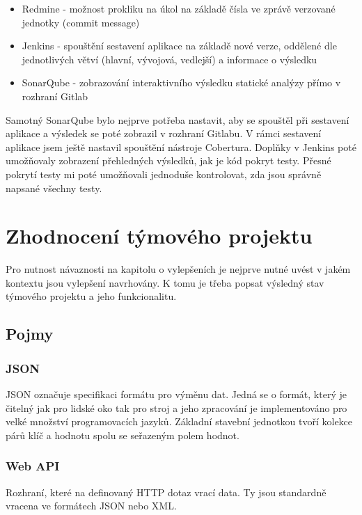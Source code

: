 \documentclass[thesis=B,czech]{FITthesis}[2012/06/26]
\begin{document}
\begin{itemize}
\item Redmine - možnost prokliku na úkol na základě čísla ve zprávě verzované jednotky (commit message)
\item Jenkins - spouštění sestavení aplikace na základě nové verze, oddělené dle jednotlivých větví (hlavní, vývojová, vedlejší) a
				informace o výsledku
\item SonarQube - zobrazování interaktivního výsledku statické analýzy přímo v rozhraní Gitlab
\end{itemize}

Samotný SonarQube bylo nejprve potřeba nastavit, aby se spouštěl při sestavení aplikace a výsledek se poté zobrazil v rozhraní
Gitlabu. V rámci sestavení aplikace jsem ještě nastavil spouštění nástroje Cobertura.
Doplňky v Jenkins poté umožňovaly zobrazení přehledných výsledků, jak je kód pokryt testy. Přesné pokrytí testy mi poté umožňovali 
jednoduše kontrolovat, zda jsou správně napsané všechny testy.

\chapter{Zhodnocení týmového projektu}
Pro nutnost návaznosti na kapitolu o vylepšeních je nejprve nutné uvést v jakém kontextu jsou vylepšení navrhovány. K tomu je třeba
popsat výsledný stav týmového projektu a jeho funkcionalitu. 

\section{Pojmy}

\subsection{JSON}
JSON označuje specifikaci formátu pro výměnu dat\cite{JSON}. Jedná se o formát, který je čitelný jak pro lidské oko tak pro stroj\cite{JSON} a jeho zpracování je implementováno pro velké množství programovacích jazyků\cite{JSON-impl}. Základní stavební jednotkou
tvoří kolekce párů klíč a hodnotu spolu se seřazeným polem hodnot.

\subsection{Web API}
Rozhraní, které na definovaný HTTP dotaz vrací data. Ty jsou standardně vracena ve formátech JSON nebo XML.
\end{document}
